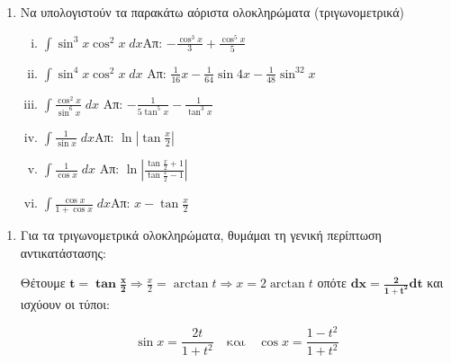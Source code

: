 \documentclass[a4paper,table]{report}
\begin{document}
\begin{enumerate}
\item Να υπολογιστούν τα παρακάτω αόριστα ολοκληρώματα (τριγωνομετρικά)
  \begin{enumerate}[i)]
\item $\int\sin^3x\cos^2x\; dx$\hfill Απ: $-\frac{\cos^3x}{3}+\frac{\cos^5x}{5}$
\item $\int\sin^4x\cos^2x\; dx$
  \hfill Απ: $\frac{1}{16}x-\frac{1}{64}\sin 4x-\frac{1}{48}\sin^32x$
\item $\int\frac{\cos^2x}{\sin^6x}\; dx$
  \hfill Απ: $-\frac{1}{5\tan^5x}-\frac{1}{\tan^3x}$
\item $\int\frac{1}{\sin x}\; dx$\hfill Απ: $\ln\left|\tan\frac{x}{2}\right|$
\item $\int\frac{1}{\cos x}\; dx$
  \hfill Απ: $\ln\left|\frac{\tan\frac{x}{2}+1}{\tan\frac{x}{2}-1}\right|$
\item $ \int\frac{\cos x}{1+\cos x}\; dx$\hfill Απ: $x-\tan\frac{x}{2}$
\end{enumerate}
\end{enumerate}

\begin{center}
  \minibox{\large\bfseries \textcolor{Col1}{Παρατηρήσεις-Υποδείξεις}}
\end{center}

\vspace{\baselineskip}

\begin{enumerate}
  \item Για τα τριγωνομετρικά ολοκληρώματα, θυμάμαι τη γενική περίπτωση αντικατάστασης: 
    \begin{center}
      Θέτουμε $ \boldsymbol{t = \tan{\frac{x}{2}}} \Rightarrow \frac{x}{2} = \arctan{t} 
      \Rightarrow x = 2 \arctan {t} $ οπότε $ \boldsymbol{dx = \frac{2}{1 + t^{2}} dt} $ 
      και ισχύουν οι τύποι:
    \end{center}
    \[
      \boxed{\sin x=\frac{2t}{1+t^2}} \quad \text{και} \quad \boxed{\cos x
      =\frac{1-t^2}{1+t^2}}
    \] 
\end{enumerate}
\end{document}

